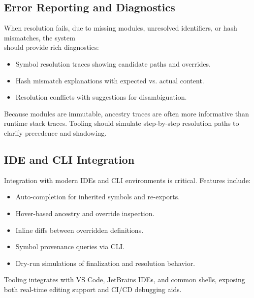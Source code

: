 \documentclass[sigplan,screen]{acmart}
\begin{document}
\subsection{Error Reporting and Diagnostics}

When resolution fails, due to missing modules, unresolved identifiers, or hash mismatches, the system \\should provide rich diagnostics:
\begin{itemize}
  \item Symbol resolution traces showing candidate paths and overrides.
  \item Hash mismatch explanations with expected vs. actual content.
  \item Resolution conflicts with suggestions for disambiguation.
\end{itemize}

Because modules are immutable, ancestry traces are often more informative than runtime stack traces. Tooling should simulate step-by-step resolution paths to clarify precedence and shadowing.

\subsection{IDE and CLI Integration}

Integration with modern IDEs and CLI environments is critical. Features include:

\begin{itemize}
  \item Auto-completion for inherited symbols and re-exports.
  \item Hover-based ancestry and override inspection.
  \item Inline diffs between overridden definitions.
  \item Symbol provenance queries via CLI.
  \item Dry-run simulations of finalization and resolution behavior.
\end{itemize}

Tooling integrates with VS Code, JetBrains IDEs, and common shells, exposing both real-time editing support and CI/CD debugging aids.
\end{document}
